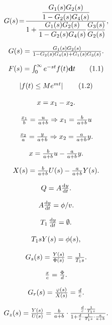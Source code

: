 \documentclass{article}
\begin{document}
\[
$$
G ( s ) \!=\! \frac{\displaystyle\frac{G_{1} ( s ) G_{2} ( s )} {1-G_{2} ( s ) G_{4} ( s )}} {\displaystyle1+\frac{\displaystyle G_{1} ( s ) G_{2} ( s )} {\displaystyle1-G_{2} ( s ) G_{4} ( s )} \frac{\displaystyle G_{3} ( s )} {\displaystyle G_{2} ( s )}},
$$
\]

\[
$$
G ( s )=\frac{G_{1} ( s ) G_{2} ( s )} {1-G_{2} ( s ) G_{4} ( s )+G_{1} ( s ) G_{3} ( s )}.
$$
\]

\[
$$
F ( s )=\int_{0}^{\infty} e^{-s t} f ( t ) {\bf d} t \tag{1.1}
$$
\]

\[
$$
\left| f ( t ) \leq M e^{m t} \right| \tag{1.2}
$$
\]

\[
$$
x=x_{1}-x_{2}.
$$
\]

\[
$$
\frac{x_{1}} {b}=\frac{u} {a+b} \Rightarrow x_{1}=\frac{b} {a+b} u
$$
\]

\[
$$
\frac{x_{2}} {a}=\frac{y} {a+b} \Rightarrow x_{2}=\frac{a} {a+b} y.
$$
\]

\[
$$
x=\frac{b} {a+b} u-\frac{a} {a+b} y.
$$
\]

\[
$$
X ( s )=\frac{b} {a+b} U ( s )-\frac{a} {a+b} Y ( s ).
$$
\]

\[
$$
Q=A \frac{\mathrm{d} y} {\mathrm{d} t}.
$$
\]

\[
$$
A \frac{\mathrm{d} y} {\mathrm{d} t}=\phi/ v.
$$
\]

\[
$$
T_{1} \, {\frac{\mathrm{d} y} {\mathrm{d} t}}=\emptyset.
$$
\]

\[
$$
T_{1} s Y ( s )=\phi( s ),
$$
\]

\[
$$
G_{s} ( s )=\frac{Y ( s )} {\Phi( s )}=\frac{1} {T_{1} s}.
$$
\]

\[
$$
{\frac{x} {c}}={\frac{\Phi} {d}}.
$$
\]

\[
$$
G_{r} ( s )=\frac{\varphi( s )} {X ( s )}=\frac{d} {c}.
$$
\]

\[
$$
G_{z} ( s )={\frac{Y ( s )} {U ( s )}}={\frac{b} {a+b}} \cdot{\frac{{\frac{d} {c}} \cdot{\frac{1} {T_{1} s}}} {1+{\frac{d} {c}} \cdot{\frac{1} {T_{1} s}} \cdot{\frac{a} {a+b}}}}.
$$
\]
\end{document}
